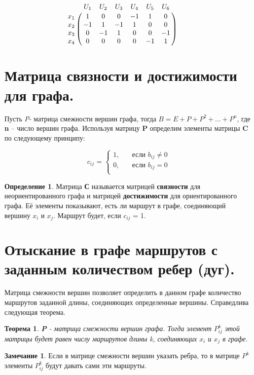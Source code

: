 \documentclass[12pt, a4paper, oneside]{article}
\theoremstyle{plain} %
\newtheorem{theorem}{Теорема}[section]
\theoremstyle{definition}
\newtheorem*{definition}{Определение}  %
\newtheorem*{remark}{Замечание}
\newcommand{\indef}[1]{\textbf{ \color{dark_red} #1}}
\begin{document}
\[
 \bordermatrix{ & U_1 & U_2 & U_3 & U_4 & U_5 & U_6  \cr
  x_1 & 1 & 0 & 0 & -1 & 1 & 0 \cr
  x_2 & -1 & 1 & -1 & 1 & 0 & 0  \cr
  x_3 & 0 & -1 & 1 & 0 & 0 & -1    \cr
  x_4 & 0 & 0 & 0 & 0 & -1 & 1  \cr
    } \qquad
\]

\section{Матрица связности и достижимости для графа.}

Пусть \textit{P}- матрица смежности вершин графа, тогда \textbf{\textit{$B = E + P + P^2 + ... + P^n$}}, где \textbf{n} – число вершин графа. Используя матрицу \textbf{P} определим элементы матрицы \textbf{C} по следующему принципу:

\[\textbf{$c_{i j}$ = } 
  \begin{cases}
    1,      &\quad\text{если } b_{i j} \neq 0 \\
    0,       & \quad \text{если  } b_{i j} = 0  \\
  \end{cases}
\]

\begin{definition}
Матрица \textbf{С} называется матрицей \indef{связности} для неориентированного графа и матрицей \indef{достижимости} для ориентированного графа. Её элементы показывают, есть ли маршрут в графе, соединяющий вершину $x_i$ и $x_j$. Маршрут будет, если $c_{i j}$ = 1.
\end{definition}

\section{Отыскание в графе маршрутов с заданным количеством ребер (дуг).}

Матрица смежности вершин позволяет определить в данном графе количество маршрутов заданной длины, соединяющих определенные вершины. Справедлива следующая теорема. \

\begin{theorem}
\textbf{P} - матрица смежности вершин графа. Тогда элемент \textbf{$P^k_{i j}$} этой матрицы будет равен числу маршрутов длины k,  соединяющих $x_i$ и $x_j$ в графе.
\end{theorem}

\begin{remark}
Если в матрице смежности вершин указать ребра, то в матрице $P^k$ элементы $P^k_{i j}$ будут давать сами эти маршруты.
\end{remark}
\end{document}
